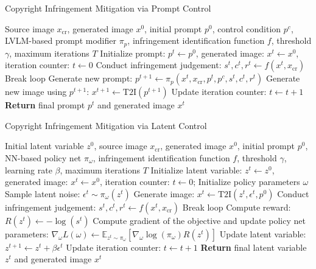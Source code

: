 \begin{algorithm}
\caption{Copyright Infringement Mitigation via Prompt Control}
\label{alg:pc}
\begin{algorithmic}[1]
\REQUIRE Source image $x_{\text{cr}}$, generated image $x^0$, initial prompt $p^0$, control condition $p^c$, LVLM-based prompt modifier $\pi_p$, infringement identification function $f$, threshold $\gamma$, maximum iterations $T$
\STATE Initialize prompt: $p^t \gets p^0$, generated image: $x^t \gets x^0$, iteration counter: $t \gets 0$
    \STATE Conduct infringement judgement: $s^t, c^t, r^t \gets f(x^t, x_{\text{cr}})$
        \STATE Break loop
    \ENDIF
    \STATE Generate new prompt: 
    \quad $p^{t+1} \gets \pi_p(x^t, x_{\text{cr}}, p^t, p^c, s^t, c^t, r^t)$
    \STATE Generate new image using $p^{t+1}$: $x^{t+1} \gets \text{T2I}(p^{t+1})$
    \STATE Update iteration counter: $t \gets t + 1$
\ENDWHILE
\STATE \textbf{Return} final prompt $p^t$ and generated image $x^t$
\end{algorithmic}
\end{algorithm}

\begin{algorithm}
\caption{Copyright Infringement Mitigation via Latent Control}
\label{alg:lc}
\begin{algorithmic}[1]
\REQUIRE Initial latent variable $z^0$, source image $x_{\text{cr}}$, generated image $x^0$, initial prompt $p^0$, NN-based policy net $\pi_{\omega}$, infringement identification function $f$, threshold $\gamma$, learning rate $\beta$, maximum iterations $T$
\STATE Initialize latent variable: $z^t \gets z^0$, generated image: $x^t \gets x^0$, iteration counter: $t \gets 0$; Initialize policy parameters $\omega$
    \STATE Sample latent noise: $\epsilon^t \sim \pi_{\omega}(z^t)$
    \STATE Generate image: $x^t \gets \text{T2I}(z^t, \epsilon^t, p^0)$
    \STATE Conduct infringement judgement: $s^t, c^t, r^t \gets f(x^t, x_{\text{cr}})$
        \STATE Break loop
    \ENDIF
    \STATE Compute reward: $R(z^t) \gets -\log(s^t)$
    \STATE Compute gradient of the objective and update policy net parameters: 
    \quad $\nabla_{\omega}L(\omega) \gets \mathbb{E}_{z^t \sim \pi_{\omega}}[\nabla_{\omega}\log(\pi_{\omega}) R(z^t)]$
    \STATE Update latent variable: $z^{t+1} \gets z^t + \beta \epsilon^t$
    \STATE Update iteration counter: $t \gets t + 1$
\ENDWHILE
\STATE \textbf{Return} final latent variable $z^t$ and generated image $x^t$
\end{algorithmic}
\end{algorithm}


